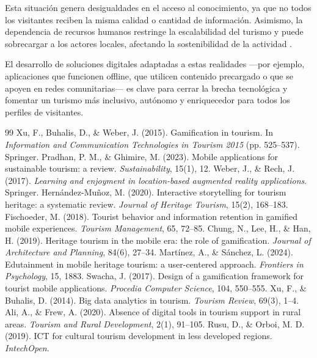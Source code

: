 \documentclass[12pt]{article}
\begin{document}
Esta situación genera desigualdades en el acceso al conocimiento, ya que no todos los visitantes reciben la misma calidad o cantidad de información. Asimismo, la dependencia de recursos humanos restringe la escalabilidad del turismo y puede sobrecargar a los actores locales, afectando la sostenibilidad de la actividad \cite{ToARist2020,Intech2019,TourismMobility2021}.

El desarrollo de soluciones digitales adaptadas a estas realidades —por ejemplo, aplicaciones que funcionen offline, que utilicen contenido precargado o que se apoyen en redes comunitarias— es clave para cerrar la brecha tecnológica y fomentar un turismo más inclusivo, autónomo y enriquecedor para todos los perfiles de visitantes.

\newpage
\renewcommand{\refname}{Referencias}
\begin{thebibliography}{99}
 Xu, F., Buhalis, D., \& Weber, J. (2015). Gamification in tourism. In \textit{Information and Communication Technologies in Tourism 2015} (pp. 525–537). Springer.
 Pradhan, P. M., \& Ghimire, M. (2023). Mobile applications for sustainable tourism: a review. \textit{Sustainability}, 15(1), 12.
 Weber, J., \& Rech, J. (2017). \textit{Learning and enjoyment in location-based augmented reality applications}. Springer.
 Hernández-Muñoz, M. (2020). Interactive storytelling for tourism heritage: a systematic review. \textit{Journal of Heritage Tourism}, 15(2), 168–183.
 Fischoeder, M. (2018). Tourist behavior and information retention in gamified mobile experiences. \textit{Tourism Management}, 65, 72–85.
 Chung, N., Lee, H., \& Han, H. (2019). Heritage tourism in the mobile era: the role of gamification. \textit{Journal of Architecture and Planning}, 84(6), 27–34.
 Martínez, A., \& Sánchez, L. (2024). Edutainment in mobile heritage tourism: a user-centered approach. \textit{Frontiers in Psychology}, 15, 1883.
 Swacha, J. (2017). Design of a gamification framework for tourist mobile applications. \textit{Procedia Computer Science}, 104, 550–555.
 Xu, F., \& Buhalis, D. (2014). Big data analytics in tourism. \textit{Tourism Review}, 69(3), 1–4.
 Ali, A., \& Frew, A. (2020). Absence of digital tools in tourism support in rural areas. \textit{Tourism and Rural Development}, 2(1), 91–105.
 Rusu, D., \& Orboi, M. D. (2019). ICT for cultural tourism development in less developed regions. \textit{IntechOpen}.

\end{thebibliography}
\end{document}
